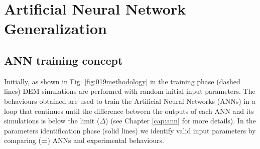 
\chapter{Artificial Neural Network Generalization}
\label{cap:anntraining}

\section{ANN training concept}
\label{sec:anntrainingconcept}

Initially, as shown in Fig. \ref{fig:019methodology} in the training phase
(dashed lines) \acs{DEM} simulations are performed
with random initial input parameters.
The behaviours obtained are used to train the
Artificial Neural Networks (\acs{ANNs}) in a loop that continues until the
difference between the outputs of each \acs{ANN} and its simulations is below the
limit ($\Delta$) (see Chapter \ref{cap:ann} for more details).
In the parameters identification phase (solid
lines) we identify valid input parameters by comparing (\textbf{=}) \acs{ANNs} and
experimental behaviours.



